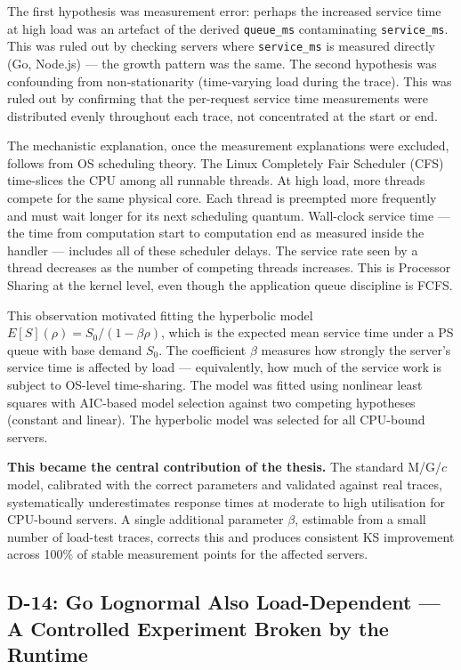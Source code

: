 The first hypothesis was measurement error: perhaps the increased service time at high load was an artefact of the derived \texttt{queue\_ms} contaminating \texttt{service\_ms}. This was ruled out by checking servers where \texttt{service\_ms} is measured directly (Go, Node.js) — the growth pattern was the same. The second hypothesis was confounding from non-stationarity (time-varying load during the trace). This was ruled out by confirming that the per-request service time measurements were distributed evenly throughout each trace, not concentrated at the start or end.

The mechanistic explanation, once the measurement explanations were excluded, follows from OS scheduling theory. The Linux Completely Fair Scheduler (CFS) time-slices the CPU among all runnable threads. At high load, more threads compete for the same physical core. Each thread is preempted more frequently and must wait longer for its next scheduling quantum. Wall-clock service time — the time from computation start to computation end as measured inside the handler — includes all of these scheduler delays. The service rate seen by a thread decreases as the number of competing threads increases. This is Processor Sharing at the kernel level, even though the application queue discipline is FCFS.

This observation motivated fitting the hyperbolic model $E[S](\rho) = S_0 / (1 - \beta\rho)$, which is the expected mean service time under a PS queue with base demand $S_0$. The coefficient $\beta$ measures how strongly the server's service time is affected by load — equivalently, how much of the service work is subject to OS-level time-sharing. The model was fitted using nonlinear least squares with AIC-based model selection against two competing hypotheses (constant and linear). The hyperbolic model was selected for all CPU-bound servers.

\textbf{This became the central contribution of the thesis.} The standard M/G/$c$ model, calibrated with the correct parameters and validated against real traces, systematically underestimates response times at moderate to high utilisation for CPU-bound servers. A single additional parameter $\beta$, estimable from a small number of load-test traces, corrects this and produces consistent KS improvement across 100\% of stable measurement points for the affected servers.

\subsection{D-14: Go Lognormal Also Load-Dependent — A Controlled Experiment Broken by the Runtime}

